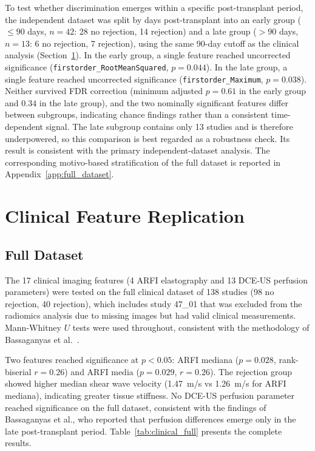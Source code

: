 To test whether discrimination emerges within a specific post-transplant period, the independent dataset was split by days post-transplant into an early group ($\leq 90$ days, $n = 42$: 28 no rejection, 14 rejection) and a late group ($> 90$ days, $n = 13$: 6 no rejection, 7 rejection), using the same 90-day cutoff as the clinical analysis (Section~\ref{sec:clinical_results}). In the early group, a single feature reached uncorrected significance (\texttt{firstorder\_RootMeanSquared}, $p = 0.044$). In the late group, a single feature reached uncorrected significance (\texttt{firstorder\_Maximum}, $p = 0.038$). Neither survived FDR correction (minimum adjusted $p = 0.61$ in the early group and $0.34$ in the late group), and the two nominally significant features differ between subgroups, indicating chance findings rather than a consistent time-dependent signal. The late subgroup contains only 13 studies and is therefore underpowered, so this comparison is best regarded as a robustness check. Its result is consistent with the primary independent-dataset analysis. The corresponding motivo-based stratification of the full dataset is reported in Appendix~\ref{app:full_dataset}.


\section{Clinical Feature Replication}
\label{sec:clinical_results}

\subsection{Full Dataset}

The 17 clinical imaging features (4 ARFI elastography and 13 DCE-US perfusion parameters) were tested on the full clinical dataset of 138 studies (98 no rejection, 40 rejection), which includes study 47\_01 that was excluded from the radiomics analysis due to missing images but had valid clinical measurements. Mann-Whitney $U$ tests were used throughout, consistent with the methodology of Bassaganyas et al.\ \cite{bassaganyas2025}.

Two features reached significance at $p < 0.05$: ARFI mediana ($p = 0.028$, rank-biserial $r = 0.26$) and ARFI media ($p = 0.029$, $r = 0.26$). The rejection group showed higher median shear wave velocity (1.47~m/s vs 1.26~m/s for ARFI mediana), indicating greater tissue stiffness. No DCE-US perfusion parameter reached significance on the full dataset, consistent with the findings of Bassaganyas et al., who reported that perfusion differences emerge only in the late post-transplant period. Table~\ref{tab:clinical_full} presents the complete results.

